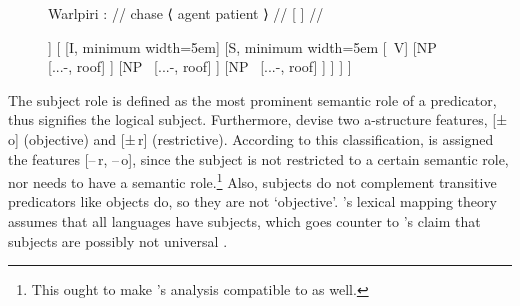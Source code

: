 \begin{figure}
\ex\label{ex:warlastruct}
\begingl[glwordalign=center]
\glpreamble Warlpiri \citep[325]{bresnan2016}: //
\gla {~\hspace{1.5em}} {} chase {\quad\normalfont ⟨} agent {\quad} patient 
{\normalfont ⟩} {} //
\glb {} {[}
	\Pred{}
	{}
	\Subj{}
	{}
	\Obj{}
	{}
	{]} //
\endgl

\begin{forest}
[IP
	[{NP~\tikzmark{warlastruct_ERGNP1}}
		[{...-\Erg{}}, roof]
	]
	[
		[I, minimum width=5em]
		[S, minimum width=5em
			[{~V}]
			[{NP~}
				[{...-\Abs{}}, roof]
			]
			[{NP~}
				[{...-\Erg{}}, roof]
			]
			[{NP~}
				[{...-\Abs{}}, roof]
			]
		]
	]
]
\end{forest}
\xe
\end{figure}

The subject role \thetaroof{} is defined as  {the
most prominent semantic role of a predicator}, thus signifies the logical
subject. Furthermore, \citet{bresnan2016} devise two a-structure features,
[±\,o] (objective) and [±\,r] (restrictive). According to this classification,
\Subj{} is assigned the features [–\,r, –\,o], since the subject is not
restricted to a certain semantic role, nor needs to have a semantic
role.\footnote{This ought to make \citet{kroeger1991}'s analysis compatible to
\Lfg{} as well.} Also, subjects do not complement transitive predicators like
objects do, so they are not `objective'. \citet{bresnan2016}'s lexical mapping
theory assumes that all languages have subjects, which goes counter to
\textcites{schachter1976}{schachter2015}'s claim that subjects are possibly not
universal \citep[330--331]{bresnan2016}.

